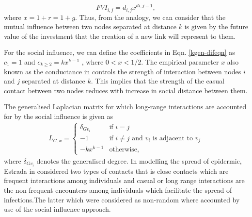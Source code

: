 \documentclass[10pt,a4paper]{article}
\begin{document}
    	    	\begin{equation}
    	    	FVI_{i,j} = d_{i,j} x^{d{i,j}-1},
    	    	\end{equation}
    	    	where $x = 1+r = 1+g$.
    	    	Thus, from the analogy, we can consider that the mutual influence between two nodes separated at distance $k$ is given by the future value of the investment that the creation of a new link will represent to them. 
    	    	
    	    	For the social influence, we can define the coefficients in Eqn. \ref{kgen-difeqn} as $c_1 =1 $ and $c_{k \geq 2} = k x^{k-1}$
    	    	, where $0 < x < 1 / 2$. The empirical parameter $x$ also known as the conductance in \citep{estrada2011epidemic} controls the strength of interaction between nodes $i$ and $j$ separated at distance $k$. This implies that the strength of the casual contact  between two nodes reduces with increase in social distance between them.
    	    	
    	    	The generalised Laplacian matrix for which long-range interactions are accounted for by the social influence is given as 
    	    	\begin{eqnarray}
    	    	L_{G,x} = \begin{cases} \delta_{Gv_i} &\mbox{if } i = j \\
    	    	-1 &\mbox{if } i \neq j \text{ and } v_i \text{ is adjacent to } v_j \\
    	    	-k x^{k-1} & \text{otherwise},
    	    	\end{cases}
    	    	\end{eqnarray}
    	    	where $\delta_{Gv_i}$ denotes the generalised degree.
    	    	 In modelling the spread of epidermic, Estrada in \citep{estrada2011epidemic} considered two types of contacts that is   close contacts  which are frequent interactions among individuals and casual or long range interactions are the non frequent encounters among individuals which facilitate the spread of infections.The latter which were considered as non-random where accounted by use of the social influence approach.
    	    	 
\end{document}
